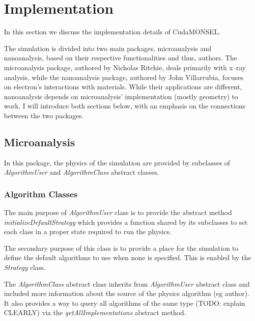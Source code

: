 \chapter{Implementation}\label{impl}
In this section we discuss the implementation details of CudaMONSEL.

The simulation is divided into two main packages, microanalysis and nanoanalysis, based on their respective functionalities and thus, authors. The microanalysis package, authored by Nicholas Ritchie, deals primarily with x--ray analysis, while the nanoanalysis package, authored by John Villarrubia, focuses on electron's interactions with materials. While their applications are different, nanoanalysis depends on microanalysis' implementation (mostly geometry) to work. I will introduce both sections below, with an emphasis on the connections between the two packages.

\section{Microanalysis}
In this package, the physics of the simulation are provided by subclasses of \emph{AlgorithmUser} and \emph{AlgorithmClass} abstract classes.

\subsection{Algorithm Classes}
The main purpose of \emph{AlgorithmUser} class is to provide the abstract method \emph{initializeDefaultStrategy} which provides a function shared by its subclasses to set each class in a proper state required to run the physics. 

The secondary purpose of this class is to provide a place for the simulation to define the default algorithms to use when none is specified. This is enabled by the \emph{Strategy} class.

The \emph{AlgorithmClass} abstract class inherits from \emph{AlgorithmUser} abstract class and included more information about the source of the physics algorithm (eg author). It also provides a way to query all algorithms of the same type (TODO: explain CLEARLY) via the \emph{getAllImplementations} abstract method.

\subsubsection{}



